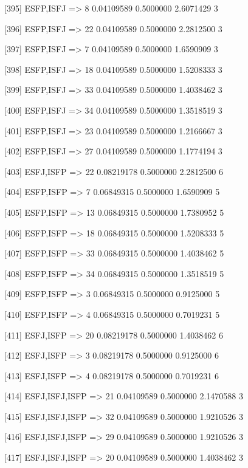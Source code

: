 [395] {ESFP,ISFJ}           => {8}  0.04109589 0.5000000  2.6071429  3   

[396] {ESFP,ISFJ}           => {22} 0.04109589 0.5000000  2.2812500  3   

[397] {ESFP,ISFJ}           => {7}  0.04109589 0.5000000  1.6590909  3   

[398] {ESFP,ISFJ}           => {18} 0.04109589 0.5000000  1.5208333  3   

[399] {ESFP,ISFJ}           => {33} 0.04109589 0.5000000  1.4038462  3   

[400] {ESFP,ISFJ}           => {34} 0.04109589 0.5000000  1.3518519  3   

[401] {ESFP,ISFJ}           => {23} 0.04109589 0.5000000  1.2166667  3   

[402] {ESFP,ISFJ}           => {27} 0.04109589 0.5000000  1.1774194  3   

[403] {ESFJ,ISFP}           => {22} 0.08219178 0.5000000  2.2812500  6   

[404] {ESFP,ISFP}           => {7}  0.06849315 0.5000000  1.6590909  5   

[405] {ESFP,ISFP}           => {13} 0.06849315 0.5000000  1.7380952  5   

[406] {ESFP,ISFP}           => {18} 0.06849315 0.5000000  1.5208333  5   

[407] {ESFP,ISFP}           => {33} 0.06849315 0.5000000  1.4038462  5   

[408] {ESFP,ISFP}           => {34} 0.06849315 0.5000000  1.3518519  5   

[409] {ESFP,ISFP}           => {3}  0.06849315 0.5000000  0.9125000  5   

[410] {ESFP,ISFP}           => {4}  0.06849315 0.5000000  0.7019231  5   

[411] {ESFJ,ISFP}           => {20} 0.08219178 0.5000000  1.4038462  6   

[412] {ESFJ,ISFP}           => {3}  0.08219178 0.5000000  0.9125000  6   

[413] {ESFJ,ISFP}           => {4}  0.08219178 0.5000000  0.7019231  6   

[414] {ESFJ,ISFJ,ISFP}      => {21} 0.04109589 0.5000000  2.1470588  3   

[415] {ESFJ,ISFJ,ISFP}      => {32} 0.04109589 0.5000000  1.9210526  3   

[416] {ESFJ,ISFJ,ISFP}      => {29} 0.04109589 0.5000000  1.9210526  3   

[417] {ESFJ,ISFJ,ISFP}      => {20} 0.04109589 0.5000000  1.4038462  3   

